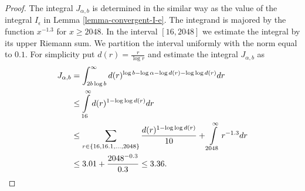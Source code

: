 \begin{proof}
The integral $J_{\alpha, b}$ is determined in the similar way as the value of the integral $I_\epsilon$ in Lemma \ref{lemma-convergent-I-e}. The integrand is majored by the function $x ^ {-1.3}$ for $x \geq 2048$. In the interval $[16, 2048]$ we estimate the integral by its upper Riemann sum. We partition the interval uniformly with the norm equal to $0.1$. For simplicity put $d(r) = \frac{r}{\log r}$ and estimate the integral $J_{\alpha, b}$ as
\[
\begin{split}
J_{\alpha, b} 
	& = \int_{2 b \log b}^{\infty} d(r) ^ {\log b - \log \alpha - \log d(r) - \log \log d(r)} dr \\
	& \leq \int\limits_{16}^{\infty} d(r) ^ {1 - \log \log d(r)} dr \\
	& \leq \sum\displaylimits_{r \in \{16, 16.1, \dots, 2048 \}} \frac{d(r) ^ {1 - \log \log d(r)}}{10} + 
		\int\limits_{2048}^{\infty} r ^ {-1.3} dr \\
	& \leq 3.01 + \frac{2048 ^ {-0.3}}{0.3} \leq 3.36 \text{.}
\end{split}
\]
\end{proof}